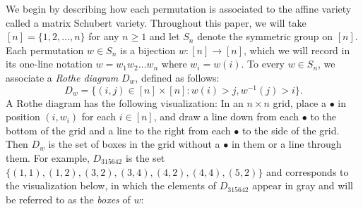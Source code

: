 \documentclass[ALCO,Unicode,published]{cedram}
\begin{document}
We begin by describing how each permutation is associated to the affine variety called a matrix Schubert variety.  Throughout this paper, we will take  $[n] = \{1,2,\dots,n\}$  for any $n \geq 1$ and let $S_n$ denote the symmetric group on $[n]$.  Each permutation $w \in S_n$ is a bijection $w:[n] \rightarrow [n]$, which we will record in its one-line notation $w = w_1 w_2 \dots w_n$ where $w_i = w(i)$.  To every $w \in S_n$, we associate a \emph{Rothe diagram} $D_w$, defined as follows:
\[
D_w = \{(i,j) \in [n] \times [n]: w(i) > j, w^{-1}(j) > i\}.
\]
A Rothe diagram has the following visualization: In an $n \times n$ grid, place a $\bullet$ in position $(i,w_i)$ for each $i \in [n]$, and draw a line down from each $\bullet$ to the bottom of the grid and a line to the right from each $\bullet$ to the side of the grid.  Then $D_w$ is the set of boxes in the grid without a $\bullet$ in them or a line through them.
For example, $D_{315642}$ is the set $\{(1,1),(1,2),(3,2),(3,4),(4,2),(4,4),(5,2)\}$ and corresponds to the visualization below, in which the elements of $D_{315642}$ appear in gray and will be referred to as the \emph{boxes} of $w$:
\end{document}
